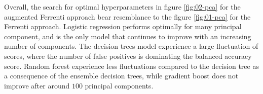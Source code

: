 Overall, the search for optimal hyperparameters in figure \ref{fig:02-pca} for the augmented Ferrenti approach bear resemblance to the figure \ref{fig:01-pca} for the Ferrenti approach. Logistic regression performs optimally for many principal component, and is the only model that continues to improve with an increasing number of components. The decision trees model experience a large fluctuation of scores, where the number of false positives is dominating the balanced accuracy score. Random forest experience less fluctuations compared to the decision tree as a consequence of the ensemble decision trees, while gradient boost does not improve after around $100$ principal components.
\begin{table}[!ht]
\centering
\caption{A table of the optimal number of principal components and the respective scores (standard deviation), as visualized in the dash-dotted line in figure \ref{fig:02-pca}.}
\label{tab:02-pc}
\noindent{}
\end{table}

